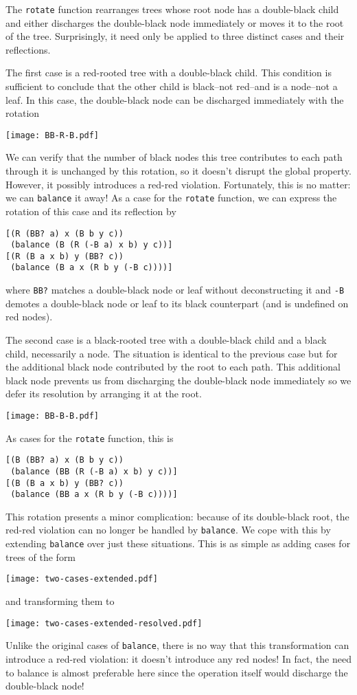 \documentclass[preprint]{sigplanconf}
\begin{document}
The \texttt{rotate} function rearranges trees whose root node has a double-black child and either discharges the double-black node immediately or moves it to the root of the tree. Surprisingly, it need only be applied to three distinct cases and their reflections.

The first case is a red-rooted tree with a double-black child. This condition is sufficient to conclude that the other child is black--not red--and is a node--not a leaf. In this case, the double-black node can be discharged immediately with the rotation
\begin{center}
\texttt{[image: BB-R-B.pdf]}
\end{center}
We can verify that the number of black nodes this tree contributes to each path through it is unchanged by this rotation, so it doesn't disrupt the global property. However, it possibly introduces a red-red violation. Fortunately, this is no matter: we can \texttt{balance} it away! As a case for the \texttt{rotate} function, we can express the rotation of this case and its reflection by
\begin{verbatim}
[(R (BB? a) x (B b y c))
 (balance (B (R (-B a) x b) y c))]
[(R (B a x b) y (BB? c))
 (balance (B a x (R b y (-B c))))]
\end{verbatim}
where \texttt{BB?} matches a double-black node or leaf without deconstructing it and \texttt{-B} demotes a double-black node or leaf to its black counterpart (and is undefined on red nodes).

The second case is a black-rooted tree with a double-black child and a black child, necessarily a node. The situation is identical to the previous case but for the additional black node contributed by the root to each path. This additional black node prevents us from discharging the double-black node immediately so we defer its resolution by arranging it at the root.
\begin{center}
\texttt{[image: BB-B-B.pdf]}
\end{center}
As cases for the \texttt{rotate} function, this is
\begin{verbatim}
[(B (BB? a) x (B b y c))
 (balance (BB (R (-B a) x b) y c))]
[(B (B a x b) y (BB? c))
 (balance (BB a x (R b y (-B c))))]
\end{verbatim}
This rotation presents a minor complication: because of its double-black root, the red-red violation can no longer be handled by \texttt{balance}. We cope with this by extending \texttt{balance} over just these situations. This is as simple as adding cases for trees of the form
\begin{center}
\texttt{[image: two-cases-extended.pdf]}
\end{center}
and transforming them to
\begin{center}
\texttt{[image: two-cases-extended-resolved.pdf]}
\end{center}
Unlike the original cases of \texttt{balance}, there is no way that this transformation can introduce a red-red violation: it doesn't introduce any red nodes! In fact, the need to balance is almost preferable here since the operation itself would discharge the double-black node!
\end{document}
